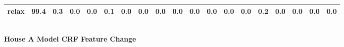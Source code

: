 \documentclass{article}
\begin{document}
\begin{sideways}
\begin{tabular}{lrrrrrrrrrrrrrrrrrr}
relax                         &        99.4 &                0.3 &           0.0 &                          0.0 &                0.1 &                0.0 &                        0.0 &          0.0 &              0.0 &                0.0 &                    0.0 &                      0.0 &                  0.0 &                   0.2 &              0.0 &              0.0 &                                  0.0 &          0.0 \\
\bottomrule
\end{tabular}
\end{sideways}
\normalsize
\vspace{1cm}\\
\textbf{House A Model CRF Feature Change}\\
\vspace{1cm}\\
\end{document}
